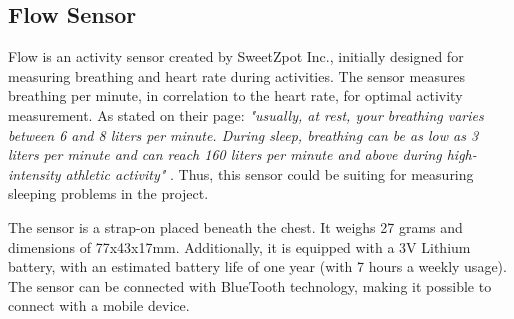


\subsection{Flow Sensor}\label{bg:flow}
Flow is an activity sensor created by SweetZpot Inc., initially designed for measuring breathing and heart rate during activities. The sensor measures breathing per minute, in correlation to the heart rate, for optimal activity measurement. As stated on their page: \textit{"usually, at rest, your breathing varies between 6 and 8 liters per minute. During sleep, breathing can be as low as 3 liters per minute and can reach 160 liters per minute and above during high-intensity athletic activity"} \cite{flow}. Thus, this sensor could be suiting for measuring sleeping problems in the project.

The sensor is a  strap-on placed beneath the chest. It weighs 27 grams and dimensions of 77x43x17mm. Additionally, it is equipped with a 3V Lithium battery, with an estimated battery life of one year (with 7 hours a weekly usage). The sensor can be connected with BlueTooth technology, making it possible to connect with a mobile device.